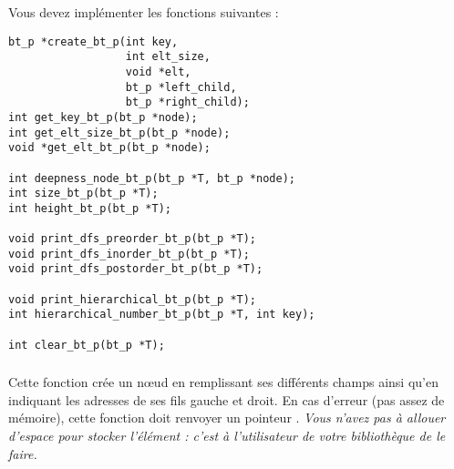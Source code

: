 


\bigskip

\noindent Vous devez implémenter les fonctions suivantes :

\bigskip

\lstset{language=C}
\begin{lstlisting}[frame=single]
bt_p *create_bt_p(int key,
                  int elt_size,
                  void *elt,
                  bt_p *left_child,
                  bt_p *right_child);
int get_key_bt_p(bt_p *node);
int get_elt_size_bt_p(bt_p *node);
void *get_elt_bt_p(bt_p *node);

int deepness_node_bt_p(bt_p *T, bt_p *node);
int size_bt_p(bt_p *T);
int height_bt_p(bt_p *T);

void print_dfs_preorder_bt_p(bt_p *T);
void print_dfs_inorder_bt_p(bt_p *T);
void print_dfs_postorder_bt_p(bt_p *T);

void print_hierarchical_bt_p(bt_p *T);
int hierarchical_number_bt_p(bt_p *T, int key);

int clear_bt_p(bt_p *T);
\end{lstlisting}


\subsubsection*{}

\noindent Cette fonction crée un nœud en remplissant ses différents champs ainsi qu'en indiquant les adresses de ses fils gauche et droit.
En cas d'erreur (pas assez de mémoire), cette fonction doit renvoyer un pointeur .
\textit{Vous n'avez pas à allouer d'espace pour stocker l'élément  : c'est à l'utilisateur de votre bibliothèque de le faire.}

\subsubsection*{}

